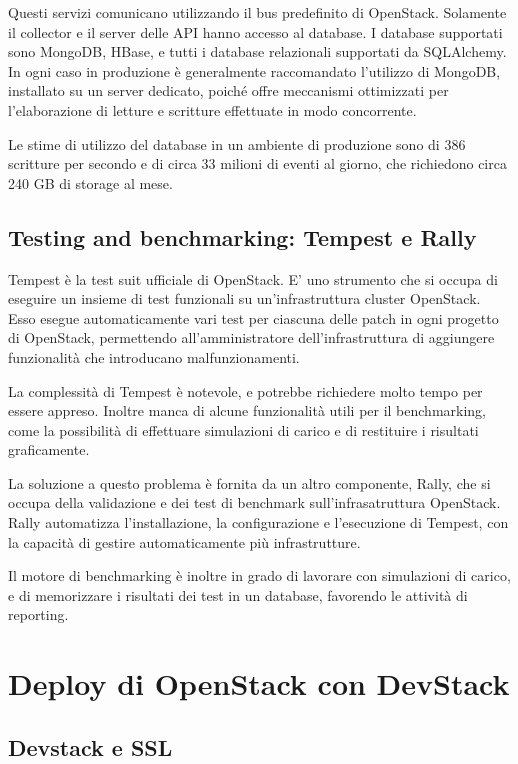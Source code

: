 Questi servizi comunicano utilizzando il bus predefinito di OpenStack. Solamente il collector e il server delle API hanno accesso al database.
I database supportati sono MongoDB, HBase, e tutti i database relazionali  supportati da SQLAlchemy.
In ogni caso in produzione è generalmente raccomandato l'utilizzo di MongoDB,  installato su un server dedicato, poiché offre meccanismi ottimizzati per l'elaborazione di letture e scritture effettuate in modo concorrente.

Le stime di utilizzo del database in un ambiente di produzione sono di 386 scritture per secondo e di circa 33 milioni di eventi al giorno, che richiedono circa 240 GB di storage al mese.

\subsection{Testing and benchmarking: Tempest e Rally}
Tempest è la test suit ufficiale di OpenStack. E' uno strumento che si occupa di eseguire un insieme di test funzionali su un'infrastruttura cluster OpenStack.
Esso esegue automaticamente vari test per ciascuna delle patch in ogni progetto di OpenStack, permettendo all'amministratore dell'infrastruttura di aggiungere funzionalità che introducano malfunzionamenti.

La complessità di Tempest è notevole, e potrebbe richiedere molto tempo per essere appreso. Inoltre manca di alcune funzionalità utili per il benchmarking, come la possibilità di effettuare simulazioni di carico e di restituire i risultati graficamente.

La soluzione a questo problema è fornita da un altro componente, Rally, che si occupa della validazione e dei test di benchmark sull'infrasatruttura OpenStack.
Rally automatizza l'installazione, la configurazione e l'esecuzione di Tempest, con la capacità di gestire automaticamente più infrastrutture.

Il motore di benchmarking è inoltre in grado di lavorare con simulazioni di carico, e di memorizzare i risultati dei test in un database, favorendo le attività di reporting.
\vfill
\newpage
\section{Deploy di OpenStack con DevStack}

\subsection{Devstack e SSL}

